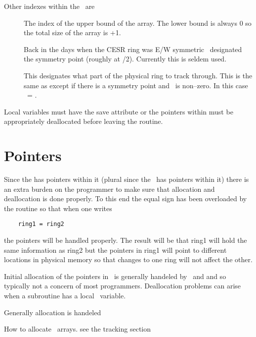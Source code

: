 Other indexes within the \ringstruct\ are
\begin{description}
\item[\nelemaxx] The index of the upper bound of the \ele{:} array.
The lower bound is always 0 so the total size of the \ele{:} array is
\nelemaxx+1.
\item[\nelesymm] Back in the days when the CESR ring was E/W 
symmetric \nelesymm\ designated the symmetry point (roughly at \nelering/2). 
Currently this is seldem used.
\item[\neleuse] This designates what part of the physical ring to track 
through. This is the same as \nelering except if there is a symmetry point and \nelesymm\ is non--zero. In this case \neleuse\ = \nelesymm.
\end{description}

Local \ringstruct variables must have the save attribute or the
pointers within must be appropriately deallocated before leaving the
routine.

\section{Pointers}

Since the \ringstruct has pointers within it (plural since the \elestruct\
has pointers within it) there is an extra burden on the programmer to
make sure that allocation and deallocation is done properly. To this
end the equal sign has been overloaded by the routine 
so that when one writes
\begin{verbatim}
    ring1 = ring2
\end{verbatim}
the pointers will be handled properly. The result will be that ring1
will hold the same information as ring2 but the pointers in ring1 will
point to different locations in physical memory so that changes to one
ring will not affect the other.

Initial allocation of the pointers in \ringstruct\ is generally
handeled by \bmadparser\ and  and so typically not a
concern of most programmers. Deallocation problems can arise when a
subroutine has a local \ringstruct\ variable. 



Generally allocation is handeled

How to allocate \coordstruct\ arrays. see the tracking section
